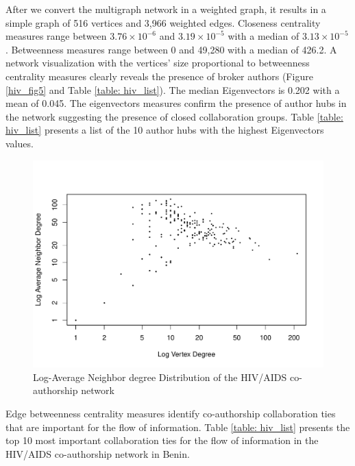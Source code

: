 After we convert the multigraph network in a weighted graph, it results in a simple graph of 516 vertices and 3,966 weighted edges. Closeness centrality measures range between $3.76\times 10^{-6}$ and $3.19\times 10^{-5}$ with a median of $3.13\times 10^{-5}$. Betweenness measures range between 0 and 49,280 with a median of 426.2. A network visualization with the vertices' size proportional to betweenness centrality measures clearly reveals the presence of broker authors (Figure \ref{hiv_fig5} and Table \ref{table: hiv_list}). The median Eigenvectors is 0.202 with a mean of 0.045. The eigenvectors measures confirm the presence of author hubs in the network suggesting the presence of closed collaboration groups. Table \ref{table: hiv_list} presents a list of the 10 author hubs with the highest Eigenvectors values.

\begin{figure}[h!]
\centering
\includegraphics[scale=0.65]{Chapters/hiv/logAvgDegree}
\caption{Log-Average Neighbor degree Distribution of the HIV/AIDS co-authorship network}
\label{hiv_fig2}
\end{figure}

Edge betweenness centrality measures identify co-authorship collaboration ties that are important for the flow of information. Table \ref{table: hiv_list} presents the top 10 most important collaboration ties for the flow of information in the HIV/AIDS co-authorship network in Benin.


